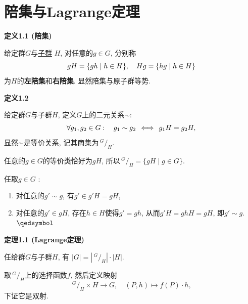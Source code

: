 \documentclass[UTF8]{ctexart}
\begin{document}
\setlength{\abovedisplayskip}{1pt}
\setlength{\belowdisplayskip}{1pt}

\section{陪集与Lagrange定理}

\hypertarget{sec:定义1.1}{}
\noindent\textbf{定义1.1 (陪集)}

给定群$G$与\href{02 子群#nameddest=sec:定义1.1}{子群} $H$,
对任意的$g\in G$, 分别称
\[
    gH=\{gh\mid h\in H\},\quad Hg=\{hg\mid h\in H\}\\[1pt]
\]
为$H$的\textbf{左陪集}和\textbf{右陪集}. 显然陪集与原子群等势.

\vspace{10pt}

\hypertarget{sec:定义1.2}{}
\noindent\textbf{定义1.2}

给定群$G$与子群$H$, 定义$G$上的二元关系$\sim$:
\[
    \forall g_1,g_2\in G:\quad g_1\sim g_2\,\iff\,g_1H=g_2H,\\[5pt]
\]
显然$\sim$是等价关系, 记其商集为$\,\!^{\displaystyle G}
\!/_{\displaystyle H}$.

\vspace{5pt}
任意的$g\in G$的等价类恰好为$gH$, 所以$\,\!^{\displaystyle G}
\!/_{\displaystyle H}=\{gH\mid g\in G\}$.


任取$g\in G$ :
\begin{enumerate}
    \item 对任意的$g'\sim g$, 有$g'\in g'H=gH$,
    \item 对任意的$g'\in gH$, 存在$h\in H$使得$g'=gh$,
    从而$g'H=ghH=gH$, 即$g'\sim g$. \hfill $\qedsymbol$
\end{enumerate}

\vspace{15pt}

\hypertarget{sec:定理1.1}{}
\noindent\textbf{定理1.1 (Lagrange定理)}

任给群$G$与子群$H$, 有
$|G|=\left|\,\!^{\displaystyle G}\!/_{\displaystyle H}\right|\cdot|H|$.

\vspace{3pt}

\vspace{3pt}
取$\,\!^{\displaystyle G}\!/_{\displaystyle H}$上的选择函数$f$,
然后定义映射
\vspace{3pt}
\[
    \,\!^{\displaystyle G}\!/_{\displaystyle H}\times H\to G,\quad
    (P,h)\mapsto f(P)\cdot h,
\]
下证它是双射.
\end{document}
